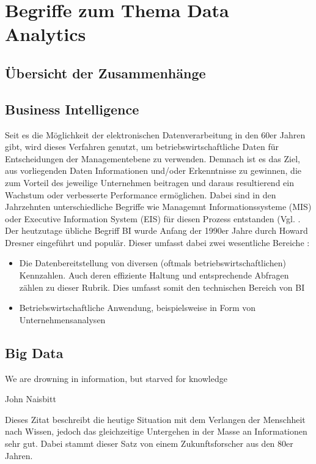 
\section{Begriffe zum Thema Data Analytics}
\subsection{Übersicht der Zusammenhänge}
\subsection{Business Intelligence}
\label{sub:bi}
Seit es die Möglichkeit der elektronischen Datenverarbeitung in den 60er Jahren gibt, wird dieses Verfahren genutzt, um betriebswirtschaftliche Daten für Entscheidungen der Managementebene zu verwenden.
Demnach ist es das Ziel, aus vorliegenden Daten Informationen und/oder Erkenntnisse zu gewinnen, die zum Vorteil des jeweilige Unternehmen beitragen und daraus resultierend ein Wachstum oder verbesserte Performance ermöglichen.
Dabei sind in den Jahrzehnten unterschiedliche Begriffe wie \glqq Managemnt Informationssysteme (MIS)\grqq{} oder \glqq Executive Information System (EIS)\grqq{} für diesen Prozess entstanden (Vgl. \cite[S.3]{Engels.2015}.
Der heutzutage übliche Begriff \acrfull{BI} wurde Anfang der 1990er Jahre durch Howard Dresner eingeführt und populär.
Dieser umfasst dabei zwei wesentliche Bereiche \cite{Kemper.2004}:
\begin{itemize}
\item Die Datenbereitstellung von diversen (oftmals betriebswirtschaftlichen) Kennzahlen. 
Auch deren effiziente Haltung und entsprechende Abfragen zählen zu dieser Rubrik.
Dies umfasst somit den technischen Bereich von \gls{BI}
\item Betriebswirtschaftliche Anwendung, beispielsweise in Form von Unternehmensanalysen 
\end{itemize}

\subsection{Big Data}
\label{sub:bigdata}
\epigraph{\glqq We are drowning in information, but starved for knowledge\grqq}{John Naisbitt \cite{Naisbitt.1982}}
Dieses Zitat beschreibt die heutige Situation mit dem Verlangen der Menschheit nach Wissen, jedoch das gleichzeitige Untergehen in der Masse an Informationen sehr gut. 
Dabei stammt dieser Satz von einem Zukunftsforscher aus den 80er Jahren.

